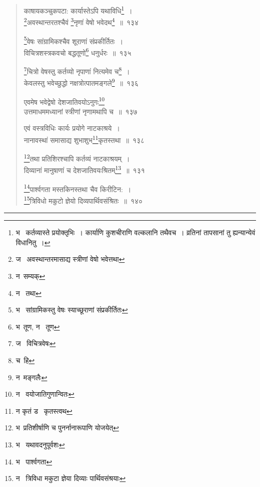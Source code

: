 \documentclass[11pt, openany]{book}
\begin{document}
\newpage

\begin{quote}
{\na काषायकञ्चुकपटा: कार्यास्तेऽपि यथाविधि\renewcommand{\thefootnote}{1}\footnote{भ \textendash\ कर्तव्यास्ते प्रयोक्तृभिः~। कार्याणि कुशचीराणि वल्कलानि तथैवच~। व्रतिनां तापसानां तु ह्यन्यान्येवं विधानितु~।}~।\\
\renewcommand{\thefootnote}{2}\footnote{ज \textendash\ अवस्थान्तरमासाद्य स्त्रीणां वेषो भवेत्तथा}अवस्थान्तरतश्चैवं \renewcommand{\thefootnote}{3}\footnote{न\textendash\ सम्यक्}नृणां वेषो भवेदथ\renewcommand{\thefootnote}{4}\footnote{न \textendash\ तथा}~॥~१३४

\renewcommand{\thefootnote}{5}\footnote{भ \textendash\ सांग्रामिकस्तु वेषः स्याच्छूराणां संप्रकीर्तितः}वेषः सांग्रामिकश्चैव शूराणां संप्रकीर्तितः~।\\
विचित्रशस्त्रकवचो बद्धतूणो\renewcommand{\thefootnote}{6}\footnote{भ\textendash\ तूण, न \textendash\ तूण} धनुर्धरः~॥~१३५

\renewcommand{\thefootnote}{7}\footnote{ज \textendash\ विचित्रवेषः}चित्रो वेषस्तु कर्तव्यो नृपाणां नित्यमेव च\renewcommand{\thefootnote}{8}\footnote{च\textendash\ हि}~।\\
केवलस्तु भवेच्छुद्धो नक्षत्रोत्पातमङ्गले\renewcommand{\thefootnote}{9}\footnote{न\textendash\ मङ्गलैः}~॥~१३६

एवमेष भवेद्वेषो देशजातिवयोऽनुगः\renewcommand{\thefootnote}{10}\footnote{न \textendash\ वयोजातिगुणान्वितः}\\
उत्तमाधममध्यानां स्त्रीणां नृणामथापि च~॥~१३७

एवं वस्त्रविधिः कार्यः प्रयोगे नाटकाश्रये~।\\
नानावस्थां समासाद्य शुभाशुभ\renewcommand{\thefootnote}{11}\footnote{न कृतं ड \textendash\ कृतस्त्वथ}कृतस्तथा~॥~१३८

\renewcommand{\thefootnote}{12}\footnote{भ\textendash\ प्रतिशीर्षाणि च पुनर्नानारूपाणि योजयेत्}तथा प्रतिशिरश्चापि कर्तव्यं नाटकाश्रयम्~।\\
दिव्यानां मानुषाणां च देशजातिवयःश्रितम्\renewcommand{\thefootnote}{13}\footnote{भ \textendash\ यथावदनुपूर्वशः}~॥~१३१

\renewcommand{\thefootnote}{14}\footnote{भ \textendash\ पार्श्वगता}पार्श्वगता मस्तकिनस्तथा चैव किरीटिन:~।\\
\renewcommand{\thefootnote}{15}\footnote{न \textendash\ त्रिविधा मकुटा ज्ञेया दिव्याः पार्थिवसंश्रयाः}त्रिविधो मकुटो ज्ञेयो दिव्यपार्थिवसंश्रितः~॥~१४०}
\end{quote}

\hrule
\end{document}
